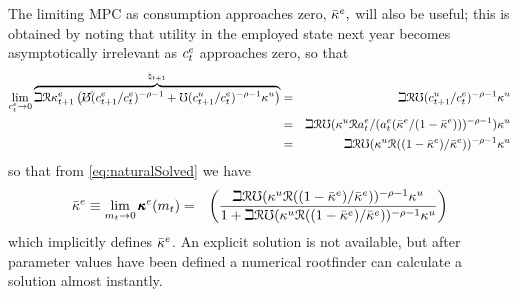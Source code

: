 \documentclass{handout}
\begin{document}
The limiting MPC as consumption approaches zero, $\bar{\kappa}^{e},$ will also be useful; this is obtained
by noting that utility in the employed state next year becomes asymptotically irrelevant as $c^{e}_{t}$ approaches zero, so that 
\begin{eqnarray*}
  \lim_{c^{e}_{t} \rightarrow 0}  \overbrace{ \beth \mathcal{R} \kappa^{e}_{t+1} \left(\cancel{\mho} (c^{e}_{t+1}/c^{e}_{t})^{-\rho-1}  + \mho (c^{u}_{t+1}/c^{e}_{t})^{-\rho-1}\kappa^{u}\right)}^{\natural_{t+1}} & = & \beth \mathcal{R} \mho (c^{u}_{t+1}/c^{e}_{t})^{-\rho-1}\kappa^{u}
\\  & = & \beth \mathcal{R} \mho (\kappa^{u} \mathcal{R} a^{e}_{t}/(a^{e}_{t}(\bar{\kappa}^{e}/(1-\bar{\kappa}^{e})))^{-\rho-1})\kappa^{u}
\\ & = & \beth \mathcal{R} \mho (\kappa^{u} \mathcal{R} ((1-\bar{\kappa}^{e})/\bar{\kappa}^{e}))^{-\rho-1}\kappa^{u}
\end{eqnarray*}
so that from \eqref{eq:naturalSolved} we have 
\begin{eqnarray}
  \bar{\kappa}^{e} \equiv \lim_{m_{t} \rightarrow 0} \pmb{\kappa}^{e}(m_{t}) & = & \left(\frac{
\beth \mathcal{R} \mho (\kappa^{u} \mathcal{R} ((1-\bar{\kappa}^{e})/\bar{\kappa}^{e}))^{-\rho-1}\kappa^{u}
}{1+
\beth \mathcal{R} \mho (\kappa^{u} \mathcal{R} ((1-\bar{\kappa}^{e})/\bar{\kappa}^{e}))^{-\rho-1}\kappa^{u}
}\right) \label{eq:MPCat0}
\end{eqnarray}
which implicitly defines $\bar{\kappa}^{e}$.  An explicit solution is not available, but after 
parameter values have been defined a numerical rootfinder can calculate a solution almost instantly. 
\end{document}
